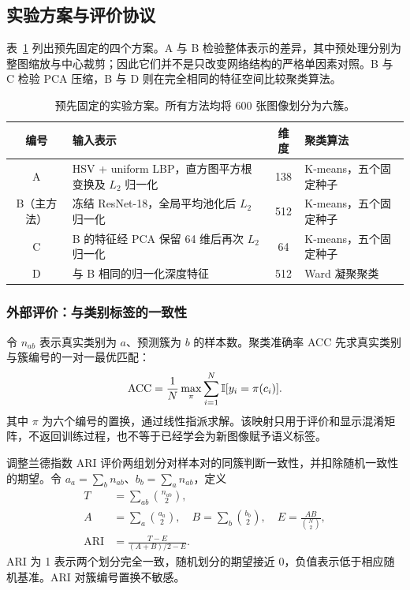 \subsection{实验方案与评价协议}
\label{sec:task1-protocol}
表~\ref{tab:task1-design} 列出预先固定的四个方案。A 与 B 检验整体表示的差异，其中预处理分别为整图缩放与中心裁剪；因此它们并不是只改变网络结构的严格单因素对照。B 与 C 检验 PCA 压缩，B 与 D 则在完全相同的特征空间比较聚类算法。

\begin{table}[t]
\caption{预先固定的实验方案。所有方法均将 600 张图像划分为六簇。}
\label{tab:task1-design}
\centering
\begin{tabular}{clcl}
\toprule
编号 & 输入表示 & 维度 & 聚类算法\\
\midrule
A & HSV + uniform LBP，直方图平方根变换及 $L_2$ 归一化 & 138 & K-means，五个固定种子\\
B（主方法） & 冻结 ResNet-18，全局平均池化后 $L_2$ 归一化 & 512 & K-means，五个固定种子\\
C & B 的特征经 PCA 保留 64 维后再次 $L_2$ 归一化 & 64 & K-means，五个固定种子\\
D & 与 B 相同的归一化深度特征 & 512 & Ward 凝聚聚类\\
\bottomrule
\end{tabular}
\end{table}

\subsubsection{外部评价：与类别标签的一致性}
令 $n_{ab}$ 表示真实类别为 $a$、预测簇为 $b$ 的样本数。聚类准确率 ACC 先求真实类别与簇编号的一对一最优匹配：
\begin{equation}
\mathrm{ACC}=\frac{1}{N}\max_{\pi}\sum_{i=1}^{N}
\mathbb{I}[y_i=\pi(c_i)].
\end{equation}
其中 $\pi$ 为六个编号的置换，通过线性指派求解。该映射只用于评价和显示混淆矩阵，不返回训练过程，也不等于已经学会为新图像赋予语义标签。

调整兰德指数 ARI\citep{hubert1985} 评价两组划分对样本对的同簇判断一致性，并扣除随机一致性的期望。令 $a_a=\sum_b n_{ab}$、$b_b=\sum_a n_{ab}$，定义
\begin{align}
T&=\sum_{ab}\binom{n_{ab}}{2},\\
A&=\sum_a\binom{a_a}{2},\quad
B=\sum_b\binom{b_b}{2},\quad
E=\frac{AB}{\binom{N}{2}},\\
\mathrm{ARI}&=\frac{T-E}{(A+B)/2-E}.
\end{align}
ARI 为 1 表示两个划分完全一致，随机划分的期望接近 0，负值表示低于相应随机基准。ARI 对簇编号置换不敏感。

